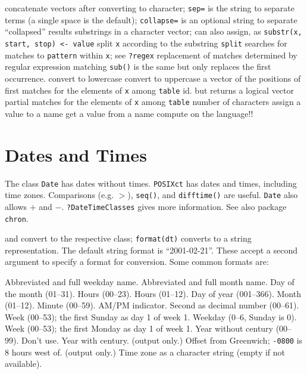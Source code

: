 	{concatenate vectors after converting to character; {\tt sep=} is the string to separate terms (a single space is the default); {\tt collapse=} is an optional string to separate ``collapsed'' results}
	{substrings in a character vector; can also assign, as {\tt substr(x, start, stop) <- value}}
	{split {\tt x} according to the substring {\tt split}}
	{searches for matches to {\tt pattern} within {\tt x}; see {\tt ?regex}}
	{replacement of matches determined by regular expression matching {\tt sub()} is the same but only replaces the first occurrence.}
	{convert to lowercase}
	{convert to uppercase}
	{a vector of the positions of first matches for the elements of {\tt x} among {\tt table}}
	{id. but returns a logical vector}
	{partial matches for the elements of {\tt x} among {\tt table}}
	{number of characters}
	{assign a value to a name}
	{get a value from a name}
	{compute on the language!!}

\section{Dates and Times}{}

The class {\tt Date} has dates without times.  {\tt POSIXct} has
dates and times, including time zones. Comparisons (e.g. $>$),
{\tt seq()}, and {\tt difftime()} are useful. {\tt Date} also allows
$+$ and $-$. {\tt ?DateTimeClasses} gives more information. See also package
{\tt chron}.

	{and}
	{convert to the respective class; {\tt format(dt)} converts to a string representation. The default string format is ``2001-02-21''. These accept a second argument to specify a format for conversion. Some common formats are:}


    	{Abbreviated and full weekday name.}
    	{Abbreviated and full month name.}
    	{Day of the month (01--31).}
    	{Hours (00--23).}
    	{Hours (01--12).}
    	{Day of year (001--366).}
    	{Month (01--12).}
    	{Minute (00--59).}
    	{AM/PM indicator. }
    	{Second as decimal number (00--61).}
    	{Week (00--53); the first Sunday as day 1 of week 1.}
    	{Weekday (0--6, Sunday is 0).}
    	{Week (00--53); the first Monday as day 1 of week 1.}
    	{Year without century (00--99). Don't use.}
    	{Year with century.}
    	{(output only.) Offset from Greenwich; {\tt -0800} is 8 hours west of.}
    	{(output only.) Time zone as a character
      string (empty if not available).}

